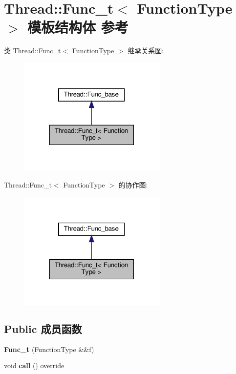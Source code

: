 \hypertarget{structThread_1_1Func__t}{}\section{Thread\+:\+:Func\+\_\+t$<$ Function\+Type $>$ 模板结构体 参考}
\label{structThread_1_1Func__t}


类 Thread\+:\+:Func\+\_\+t$<$ Function\+Type $>$ 继承关系图\+:\nopagebreak
\begin{figure}[H]
\begin{center}
\leavevmode
\includegraphics[width=209pt]{structThread_1_1Func__t__inherit__graph}
\end{center}
\end{figure}


Thread\+:\+:Func\+\_\+t$<$ Function\+Type $>$ 的协作图\+:\nopagebreak
\begin{figure}[H]
\begin{center}
\leavevmode
\includegraphics[width=209pt]{structThread_1_1Func__t__coll__graph}
\end{center}
\end{figure}
\subsection*{Public 成员函数}
\begin{DoxyCompactItemize}
\item 
\mbox{\label{structThread_1_1Func__t_af347c7e04169f92be6aff37d1d3d3a6b}} 
{\bfseries Func\+\_\+t} (Function\+Type \&\&f)
\item 
\mbox{\label{structThread_1_1Func__t_a2b6b3d0e5cd2889f589fec59782de255}} 
void {\bfseries call} () override
\end{DoxyCompactItemize}
